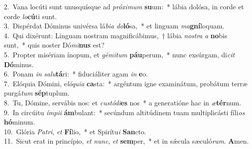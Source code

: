 {2.~}Vana locúti sunt unusquísque ad \textit{pró}\textit{xi}\textit{mum} \textbf{su}um:~* lábia dolósa, in corde et corde \textit{lo}\textbf{cú}ti sunt.\\
{3.~}Dispérdat Dóminus univérsa lá\textit{bi}\textit{a} \textit{do}\textbf{ló}sa,~* et linguam \textit{ma}\textbf{gní}loquam.\\
{4.~}Qui dixérunt: Linguam nostram magnificábimus,~† lábia \textit{no}\textit{stra} \textit{a} \textbf{no}bis sunt,~* quis noster Dó\textit{mi}\textbf{nus} est?\\
{5.~}Propter misériam ínopum, et \textit{gé}\textit{mi}\textit{tum} \textbf{páu}perum,~* nunc exsúrgam, di\textit{cit} \textbf{Dó}minus.\\
{6.~}Ponam \textit{in} \textit{sa}\textit{lu}\textbf{tá}ri:~* fiduciáliter agam \textit{in} \textbf{e}o.\\
{7.~}Elóquia Dómini, e\textit{ló}\textit{qui}\textit{a} \textbf{ca}sta:~* argéntum igne examinátum, probátum terræ purgá\textit{tum} \textbf{sép}tuplum.\\
{8.~}Tu, Dómine, servábis nos: et \textit{cu}\textit{stó}\textit{di}\textbf{es} nos~* a generatióne hac in \textit{æ}\textbf{tér}num.\\
{9.~}In circúitu \textit{ím}\textit{pi}\textit{i} \textbf{ám}bulant:~* secúndum altitúdinem tuam multiplicásti fíli\textit{os} \textbf{hó}minum.\\
{10.~}Glória \textit{Pa}\textit{tri}, \textit{et} \textbf{Fí}lio,~* et Spirítu\textit{i} \textbf{San}cto.\\
{11.~}Sicut erat in princípio, \textit{et} \textit{nunc}, \textit{et} \textbf{sem}per,~* et in sǽcula sæculó\textit{rum}. \textbf{A}men.\\
